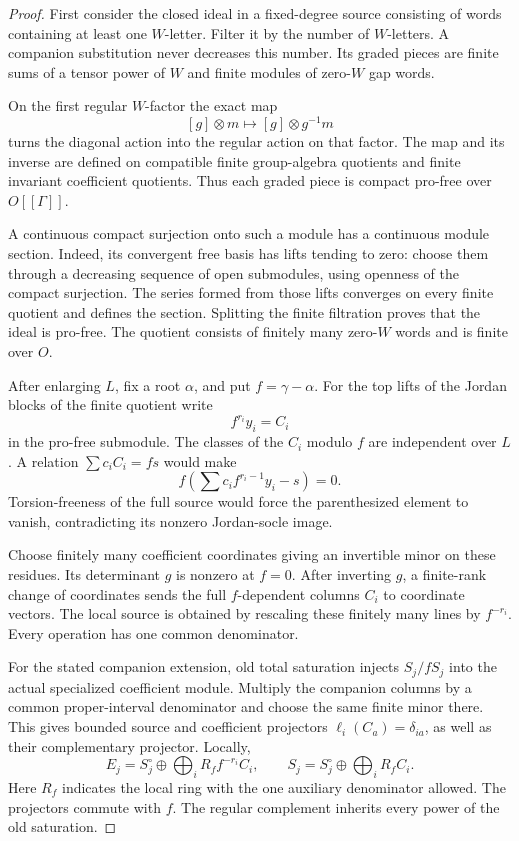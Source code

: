 \begin{proof}
First consider the closed ideal in a fixed-degree source consisting
of words containing at least one \(W\)-letter.  Filter it by the
number of \(W\)-letters.  A companion substitution never decreases
this number.  Its graded pieces are finite sums of a tensor power
of \(W\) and finite modules of zero-\(W\) gap words.

On the first regular \(W\)-factor the exact map
\[
       [g]\otimes m\longmapsto[g]\otimes g^{-1}m
\]
turns the diagonal action into the regular action on that factor.
The map and its inverse are defined on compatible finite
group-algebra quotients and finite invariant coefficient quotients.
Thus each graded piece is compact pro-free over \(O[[\Gamma]]\).

A continuous compact surjection onto such a module has a
continuous module section.  Indeed, its convergent free basis
has lifts tending to zero: choose them through a decreasing
sequence of open submodules, using openness of the compact
surjection.  The series formed from those lifts converges on
every finite quotient and defines the section.  Splitting the
finite filtration proves that the ideal is pro-free.  The
quotient consists of finitely many zero-\(W\) words and is finite
over \(O\).

After enlarging \(L\), fix a root \(\alpha\), and put
\(f=\gamma-\alpha\).  For the top lifts of the Jordan blocks of
the finite quotient write
\[
                    f^{r_i}y_i=C_i
\]
in the pro-free submodule.  The classes of the \(C_i\) modulo
\(f\) are independent over \(L\).  A relation
\(\sum c_iC_i=fs\) would make
\[
 f\left(\sum c_i f^{r_i-1}y_i-s\right)=0.
\]
Torsion-freeness of the full source would force the parenthesized
element to vanish, contradicting its nonzero Jordan-socle image.

Choose finitely many coefficient coordinates giving an invertible
minor on these residues.  Its determinant \(g\) is nonzero at
\(f=0\).  After inverting \(g\), a finite-rank change of coordinates
sends the full \(f\)-dependent columns \(C_i\) to coordinate
vectors.  The local source is obtained by rescaling these finitely
many lines by \(f^{-r_i}\).  Every operation has one common
denominator.

For the stated companion extension, old total saturation injects
\(S_j/fS_j\) into the actual specialized coefficient module.
Multiply the companion columns by a common proper-interval
denominator and choose the same finite minor there.  This gives
bounded source and coefficient projectors
\(\ell_i(C_a)=\delta_{ia}\), as well as their complementary
projector.  Locally,
\begin{equation}\label{eq:wcs-polar-coordinates}
 E_j=S_j^\circ\oplus\bigoplus_i R_f f^{-r_i}C_i,\qquad
 S_j=S_j^\circ\oplus\bigoplus_i R_f C_i .
\end{equation}
Here \(R_f\) indicates the local ring with the one auxiliary
denominator allowed.  The projectors commute with \(f\).  The
regular complement inherits every power of the old saturation.
\end{proof}

